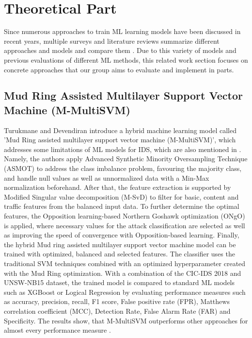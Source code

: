 \section{Theoretical Part}
Since numerous approaches to train ML learning models have been discussed in recent years, multiple surveys and literature reviews summarize different approaches and models and compare them \cite{abdulganiyu2023systematic} \cite{al2021intrusion} \cite{saranya2020performance} \cite{sowmya2023comprehensive}. Due to this variety of models and previous evaluations of different ML methods, this related work section focuses on concrete approaches that our group aims to evaluate and implement in parts.

\subsection{Mud Ring Assisted Multilayer Support Vector Machine (M-MultiSVM)}
Turukmane and Devendiran \cite{SVM} introduce a hybrid machine learning model called 'Mud Ring
assisted multilayer support vector machine (M-MultiSVM)', which addresses some limitations of ML models for IDS, which are also mentioned in \cite{al2021intrusion}. Namely, the authors apply Advanced Synthetic Minority Oversampling Technique (ASMOT) to address the class imbalance problem, favouring the majority class, and handle null values as well as unnormalized data with a Min-Max normalization beforehand. After that, the feature extraction is supported by Modified Singular value decomposition (M-SvD) to filter for basic, content and traffic features from the balanced input data. To further determine the optimal features, the Opposition learning-based Northern Goshawk optimization (ONgO) is applied, where necessary values for the attack classification are selected as well as improving the speed of convergence with Opposition-based learning. Finally, the hybrid Mud ring assisted multilayer support vector machine model can be trained with optimized, balanced and selected features. The classifier uses the traditional SVM techniques combined with an optimized hyperparameter created with the Mud Ring optimization. With a combination of the CIC-IDS 2018 and UNSW-NB15 dataset, the trained model is compared to standard ML models such as XGBoost or Logical Regression by evaluating performance measures such as accuracy, precision, recall, F1 score, False positive rate (FPR), Matthews correlation coefficient (MCC), Detection Rate, False Alarm Rate (FAR) and Specificity. The results show, that M-MultiSVM outperforms other approaches for almost every performance measure \cite{SVM}.


